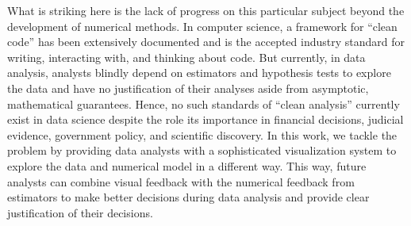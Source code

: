 What is striking here is the lack of progress on this particular subject beyond the development of numerical methods. In computer science, a framework for ``clean code'' has been extensively documented and is the accepted industry standard for writing, interacting with, and thinking about code. But currently, in data analysis, analysts blindly depend on estimators and hypothesis tests to explore the data and have no justification of their analyses aside from asymptotic, mathematical guarantees. Hence, no such standards of ``clean analysis'' currently exist in data science despite the role its importance in financial decisions, judicial evidence, government policy, and scientific discovery. In this work, we tackle the problem by providing data analysts with a sophisticated visualization system to explore the data and numerical model in a different way. This way, future analysts can combine visual feedback with the numerical feedback from estimators to make better decisions during data analysis and provide clear justification of their decisions.